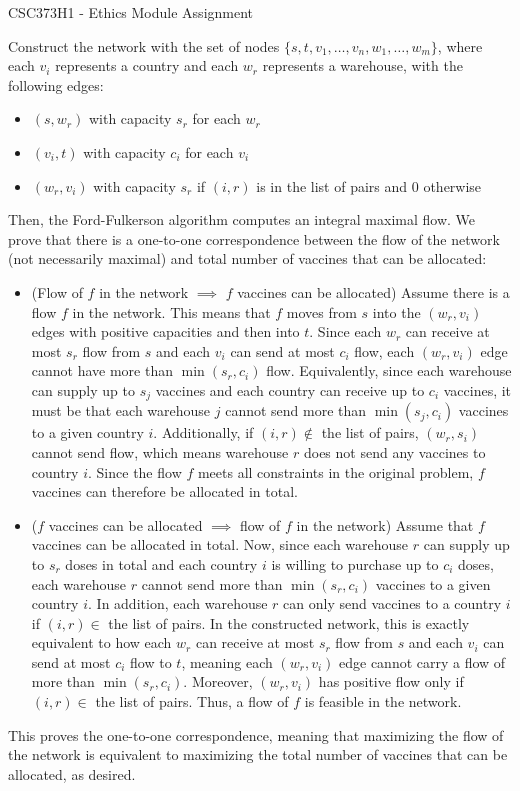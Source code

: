 \documentclass[11pt]{article}
\begin{document}
\begin{center}
    {\Large CSC373H1 - Ethics Module Assignment}
\end{center}

Construct the network with the set of nodes $\{s,t,v_1,\ldots,v_n,w_1,\ldots,w_m\}$, where each $v_i$ represents a country and each $w_r$ represents a warehouse, with the following edges:\begin{itemize}
    \item $(s,w_r)$ with capacity $s_r$ for each $w_r$
    \item $(v_i,t)$ with capacity $c_i$ for each $v_i$
    \item $(w_r,v_i)$ with capacity $s_r$ if $(i,r)$ is in the list of pairs and $0$ otherwise
\end{itemize} Then, the Ford-Fulkerson algorithm computes an integral maximal flow. We prove that there is a one-to-one correspondence between the flow of the network (not necessarily maximal) and total number of vaccines that can be allocated:\begin{itemize}
    \item (Flow of $f$ in the network $\implies$ $f$ vaccines can be allocated) Assume there is a flow $f$ in the network. This means that $f$ moves from $s$ into the $(w_r,v_i)$ edges with positive capacities and then into $t$. Since each $w_r$ can receive at most $s_r$ flow from $s$ and each $v_i$ can send at most $c_i$ flow, each $(w_r,v_i)$ edge cannot have more than $\min(s_r,c_i)$ flow. Equivalently, since each warehouse can supply up to $s_j$ vaccines and each country can receive up to $c_i$ vaccines, it must be that each warehouse $j$ cannot send more than $\min(s_j,c_i)$ vaccines to a given country $i$. Additionally, if $(i,r)\notin$ the list of pairs, $(w_r,s_i)$ cannot send flow, which means warehouse $r$ does not send any vaccines to country $i$. Since the flow $f$ meets all constraints in the original problem, $f$ vaccines can therefore be allocated in total.
    \item ($f$ vaccines can be allocated $\implies$ flow of $f$ in the network) Assume that $f$ vaccines can be allocated in total. Now, since each warehouse $r$ can supply up to $s_r$ doses in total and each country $i$ is willing to purchase up to $c_i$ doses, each warehouse $r$ cannot send more than $\min(s_r,c_i)$ vaccines to a given country $i$. In addition, each warehouse $r$ can only send vaccines to a country $i$ if $(i,r)\in$ the list of pairs. In the constructed network, this is exactly equivalent to how each $w_r$ can receive at most $s_r$ flow from $s$ and each $v_i$ can send at most $c_i$ flow to $t$, meaning each $(w_r,v_i)$ edge cannot carry a flow of more than $\min(s_r,c_i)$. Moreover, $(w_r,v_i)$ has positive flow only if $(i,r)\in$ the list of pairs. Thus, a flow of $f$ is feasible in the network.
\end{itemize} This proves the one-to-one correspondence, meaning that maximizing the flow of the network is equivalent to maximizing the total number of vaccines that can be allocated, as desired.
\end{document}
